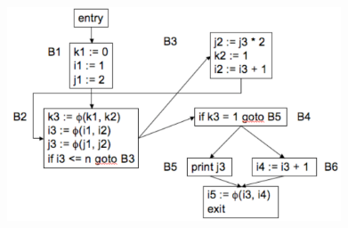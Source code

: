 \documentclass[12pt]{article}
\begin{document}
\begin{exe}
\begin{xlist}
{  \begin{soln}
  \begin{center}
  \includegraphics[height=2.5in]{figures/ssa-ex1-output}
  \end{center}
  \end{soln}
  }
  
  \end{xlist}

  \bigskip

 
\end{exe} 
\end{document}

